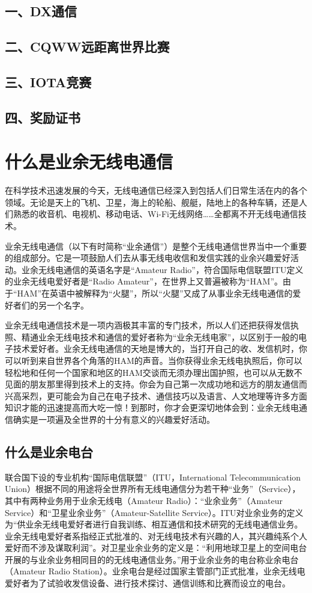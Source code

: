 \documentclass[12pt,UTF8]{ctexbook}
\begin{document}
\section{一、DX通信}
\section{二、CQWW远距离世界比赛}
\section{三、IOTA竞赛}
\section{四、奖励证书}


\chapter{什么是业余无线电通信}

在科学技术迅速发展的今天，无线电通信已经深入到包括人们日常生活在内的各个领域。无论是天上的飞机、卫星，海上的轮船、舰艇，陆地上的各种车辆，还是人们熟悉的收音机、电视机、移动电话、Wi-Fi无线网络……全都离不开无线电通信技术。

业余无线电通信（以下有时简称“业余通信”）是整个无线电通信世界当中一个重要的组成部分。它是一项鼓励人们去从事无线电收信和发信实践的业余兴趣爱好活动。业余无线电通信的英语名字是“Amateur Radio”，符合国际电信联盟ITU定义的业余无线电爱好者是“Radio Amateur”，在世界上又普遍被称为“HAM”。由于“HAM”在英语中被解释为“火腿”，所以“火腿”又成了从事业余无线电通信的爱好者们的另一个名字。

业余无线电通信技术是一项内涵极其丰富的专门技术，所以人们还把获得发信执照、精通业余无线电技术和通信的爱好者称为“业余无线电家”，以区别于一般的电子技术爱好者。业余无线电通信的天地是博大的，当打开自己的收、发信机时，你可以听到来自世界各个角落的HAM的声音。当你获得业余无线电执照后，你可以轻松地和任何一个国家和地区的HAM交谈而无须办理出国护照，也可以从无数不见面的朋友那里得到技术上的支持。你会为自己第一次成功地和远方的朋友通信而兴高采烈，更可能会为自己在电子技术、通信技巧以及语言、人文地理等许多方面知识才能的迅速提高而大吃一惊！到那时，你才会更深切地体会到：业余无线电通信确实是一项遍及全世界的十分有意义的兴趣爱好活动。

\section{什么是业余电台}

联合国下设的专业机构“国际电信联盟”（ITU，International Telecommunication Union）根据不同的用途将全世界所有无线电通信分为若干种“业务”（Service），其中有两种业务用于业余无线电（Amateur Radio）：“业余业务”（Amateur Service）和“卫星业余业务”（Amateur-Satellite Service）。ITU对业余业务的定义为“供业余无线电爱好者进行自我训练、相互通信和技术研究的无线电通信业务。业余无线电爱好者系指经正式批准的、对无线电技术有兴趣的人，其兴趣纯系个人爱好而不涉及谋取利润”。对卫星业余业务的定义是：“利用地球卫星上的空间电台开展的与业余业务相同目的的无线电通信业务。”用于业余业务的电台称业余电台（Amateur Radio Station）。业余电台是经过国家主管部门正式批准，业余无线电爱好者为了试验收发信设备、进行技术探讨、通信训练和比赛而设立的电台。
\end{document}
